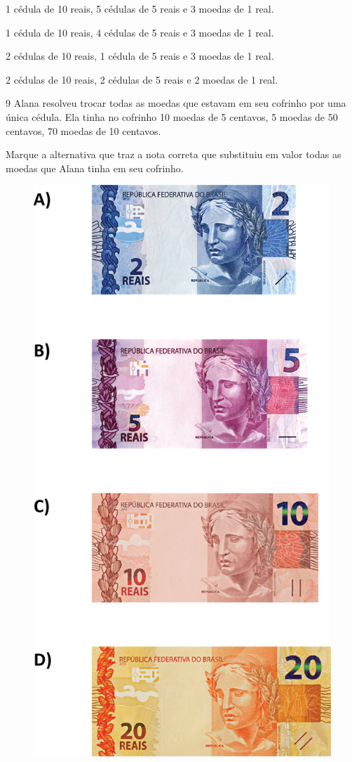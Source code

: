 \begin{escolha}

\item
  1 cédula de 10 reais, 5 cédulas de 5 reais e 3 moedas de 1 real.
\item
  1 cédula de 10 reais, 4 cédulas de 5 reais e 3 moedas de 1 real.
\item
  2 cédulas de 10 reais, 1 cédula de 5 reais e 3 moedas de 1 real.
\item
  2 cédulas de 10 reais, 2 cédulas de 5 reais e 2 moedas de 1 real.
\end{escolha}


\num{9} Alana resolveu trocar todas as moedas que estavam em seu cofrinho por uma única cédula. Ela tinha no cofrinho 10 moedas de 5 centavos, 5 moedas de
50 centavos, 70 moedas de 10 centavos.

Marque a alternativa que traz a nota correta que substituiu em valor todas as moedas que Alana tinha em seu cofrinho.

\begin{figure}[htpb!]
\includegraphics[width=.60\textwidth]{./media/image117.png}
\end{figure}

